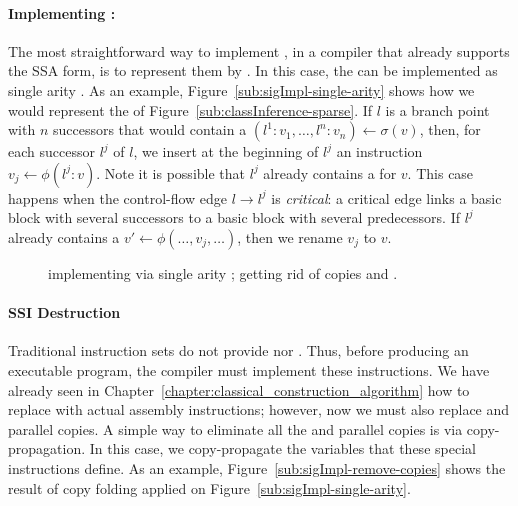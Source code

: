 {\paragraph{Implementing \sigmafuns: }
The most straightforward way to implement \sigmafuns,\index{\sigmafun} in a compiler that already supports the SSA form, is to represent them by \phifuns.
In this case, the \sigmafuns can be implemented as single arity \phifuns.
As an example, Figure~\ref{sub:sigImpl-single-arity} shows how we would represent the \sigmafuns of Figure~\ref{sub:classInference-sparse}.
If $l$ is a branch point with $n$ successors that would contain a \sigmafun $(l^1:v_1, \ldots, l^n:v_n) \gets \sigma(v)$, then, for each successor $l^j$ of $l$, we insert at the beginning of $l^j$ an instruction $v_j \gets \phi(l^j:v)$.
Note it is possible that $l^j$ already contains a \phifun for $v$.
This case happens when the control-flow edge $l \rightarrow l^j$ is {\em critical}:
a critical edge links a basic block with several successors to a basic block with several predecessors.
If $l^j$ already contains a \phifun $v' \gets \phi(\ldots, v_j, \ldots)$, then we rename $v_j$ to $v$.

\begin{figure}[t!]
\hspace{-1.3cm}
  \hfill
  \caption{\protect{} implementing \sigmafuns via single arity \phifuns; \protect{} getting rid of copies and \sigmafuns.}
\label{fig:sigImpl}
\end{figure}

\paragraph{SSI Destruction}
Traditional instruction sets do not provide \phifuns nor \sigmafuns.
Thus, before producing an executable program, the compiler must implement these instructions.
We have already seen in Chapter~\ref{chapter:classical_construction_algorithm} how to replace \phifuns with actual assembly instructions; however, now we must also replace \sigmafuns and parallel copies.
A simple way to eliminate all the \sigmafuns and parallel copies is via copy-propagation.
In this case, we copy-propagate the variables that these special instructions define.
As an example, Figure~\ref{sub:sigImpl-remove-copies} shows the result of copy folding applied on Figure~\ref{sub:sigImpl-single-arity}.

}
